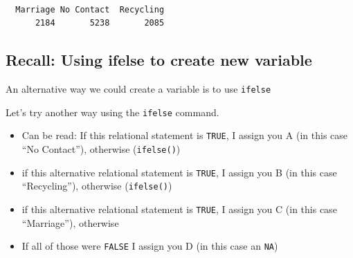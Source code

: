 \documentclass[
  letterpaper,
  DIV=11,
  numbers=noendperiod]{scrreprt}
\providecommand{\tightlist}{%
  \setlength{\itemsep}{0pt}\setlength{\parskip}{0pt}}\usepackage{longtable,booktabs,array}
\begin{document}
\begin{verbatim}

  Marriage No Contact  Recycling 
      2184       5238       2085 
\end{verbatim}

\hypertarget{recall-using-ifelse-to-create-new-variable}{%
\subsection{Recall: Using ifelse to create new
variable}\label{recall-using-ifelse-to-create-new-variable}}

An alternative way we could create a variable is to use \texttt{ifelse}

Let's try another way using the \texttt{ifelse} command.

\begin{itemize}
\tightlist
\item
  Can be read: If this relational statement is \texttt{TRUE}, I assign
  you A (in this case ``No Contact''), otherwise (\texttt{ifelse()})
\item
  if this alternative relational statement is \texttt{TRUE}, I assign
  you B (in this case ``Recycling''), otherwise (\texttt{ifelse()})
\item
  if this alternative relational statement is \texttt{TRUE}, I assign
  you C (in this case ``Marriage''), otherwise
\item
  If all of those were \texttt{FALSE} I assign you D (in this case an
  \texttt{NA})
\end{itemize}
\end{document}
